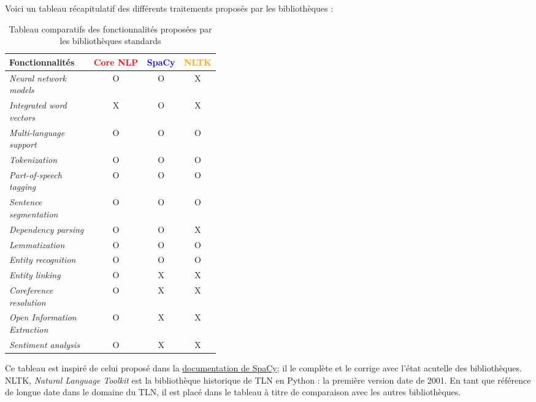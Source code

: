 Voici un tableau récapitulatif des différents traitements proposés par les bibliothèques :
\vspace{10pt}
\begin{table}[H]
    \centering
    \begin{tabular}{| p{0.4\linewidth} | c | c | c |}
        \hline 
        \textbf{Fonctionnalités} &\textcolor{red}{Core NLP} &\textcolor{blue}{SpaCy} &\textcolor{orange}{NLTK}\\
        \hline
        \hline 
        \textit{Neural network models} &O &O &X\\
        \hline 
        \textit{Integrated word vectors} &X &O &X\\
        \hline 
        \textit{Multi-language support} &O &O &O\\
        \hline 
        \textit{Tokenization} &O &O &O\\
        \hline
        \textit{Part-of-speech tagging} &O &O &O\\		
        \hline 
        \textit{Sentence segmentation} &O &O &O\\
        \hline 
        \textit{Dependency parsing} &O &O &X\\
        \hline
        \textit{Lemmatization} &O &O &O\\
        \hline 
        \textit{Entity recognition} &O &O &O\\
        \hline 
        \textit{Entity linking} &O &X &X\\
        \hline 
        \textit{Coreference resolution} &O &X &X\\
        \hline 
        \textit{Open Information Extraction} &O &X &X\\
        \hline 
        \textit{Sentiment analysis} &O &X &X\\
        \hline
    \end{tabular}
    \caption{Tableau comparatifs des fonctionnalités proposées par les bibliothèques standards}
    \label{tab:nlp-compare}
\end{table}
\vspace{5pt}

Ce tableau est inspiré de celui proposé dans la \href{https://spacy.io/usage/facts-figures}{documentation de SpaCy}; il le complète et le corrige avec l'état acutelle des bibliothèques. NLTK, \textit{Natural Language Toolkit} est la bibliothèque historique de TLN en Python : la première version date de 2001. En tant que référence de longue date dans le domaine du TLN, il est placé dans le tableau à titre de comparaison avec les autres bibliothèques.
\newline

